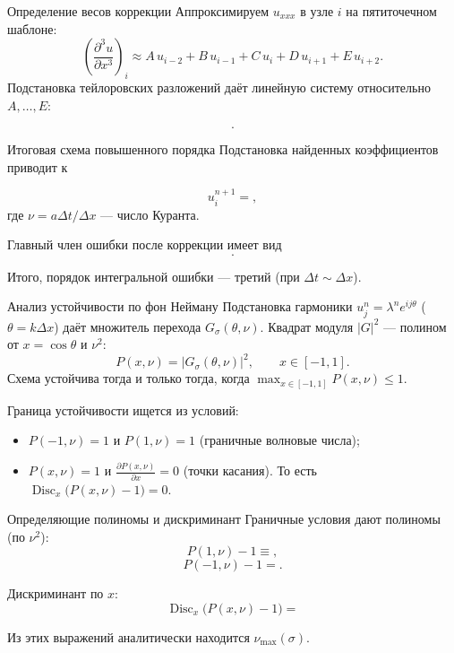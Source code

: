 \documentclass[12pt, aspectratio=169]{beamer}
\renewcommand{\normalsize}{\fontsize{10.000000}{12.000000}\selectfont}
\begin{document}
\begin{frame}{Определение весов коррекции}
Аппроксимируем $u_{xxx}$ в узле $i$ на пятиточечном шаблоне:
\[
\left(\frac{\partial^3 u}{\partial x^3}\right)_i
\approx A\,u_{i-2} + B\,u_{i-1} + C\,u_i + D\,u_{i+1} + E\,u_{i+2}.
\]
Подстановка тейлоровских разложений даёт линейную систему относительно $A,\dots,E$:

\vspace{0.3cm}
\[
.
\]
\end{frame}


\begin{frame}{Итоговая схема повышенного порядка}
Подстановка найденных коэффициентов приводит к

\begin{dmath*}
u_i^{n+1} =
,
\end{dmath*}
\normalsize
где $\nu = a\Delta t/\Delta x$ — число Куранта.

Главный член ошибки после коррекции имеет вид
\[
.
\]

Итого, порядок интегральной ошибки — третий (при $\Delta t \sim \Delta x$).
\end{frame}


\begin{frame}{Анализ устойчивости по фон Нейману}
Подстановка гармоники $u_j^n = \lambda^n e^{ij\theta}$ ($\theta = k\Delta x$) даёт
множитель перехода $G_\sigma(\theta,\nu)$. Квадрат модуля $|G|^2$ — полином
от $x = \cos\theta$ и $\nu^2$:
\[
P(x,\nu) = |G_\sigma(\theta,\nu)|^2,\qquad x\in[-1,1].
\]
Схема устойчива тогда и только тогда, когда $\displaystyle\max_{x\in[-1,1]} P(x,\nu) \le 1$.

Граница устойчивости ищется из условий:
\begin{itemize}
\item $P(-1,\nu) = 1$ и $P(1,\nu) = 1$ (граничные волновые числа);
\item $P(x,\nu) = 1$ и $\frac{\partial P(x,\nu)}{\partial x} = 0$ (точки касания). То есть $\operatorname{Disc}_x\bigl(P(x,\nu)-1\bigr)=0$.
\end{itemize}
\end{frame}


\begin{frame}{Определяющие полиномы и дискриминант}
Граничные условия дают полиномы (по $\nu^2$):
\[
P(1,\nu)-1 \equiv
,
\]
\[
P(-1,\nu)-1 =
.
\]

Дискриминант по $x$:
\begin{dmath*}
\operatorname{Disc}_x\bigl(P(x,\nu)-1\bigr) =

\end{dmath*}

Из этих выражений аналитически находится $\nu_{\max}(\sigma)$.
\end{frame}
\end{document}
